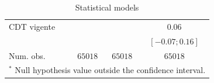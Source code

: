 \begin{table}
\begin{center}
\begin{tabular}{l c c c}
CDT vigente                 &                   &                     & $0.06$              \\
                            &                   &                     & $ [ -0.07;   0.16]$ \\
\hline
Num. obs.                   & $65018$           & $65018$             & $65018$             \\
\hline
\multicolumn{4}{l}{\scriptsize{$^*$ Null hypothesis value outside the confidence interval.}}
\end{tabular}
\caption{Statistical models}
\label{table:coefficients}
\end{center}
\end{table}
